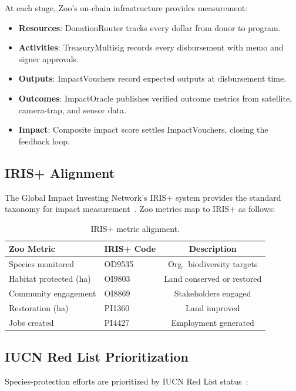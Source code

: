 \documentclass[11pt,letterpaper]{article}
\begin{document}
At each stage, Zoo's on-chain infrastructure provides measurement:

\begin{itemize}
    \item \textbf{Resources}: DonationRouter tracks every dollar from donor to program.
    \item \textbf{Activities}: TreasuryMultisig records every disbursement with memo and signer approvals.
    \item \textbf{Outputs}: ImpactVouchers record expected outputs at disbursement time.
    \item \textbf{Outcomes}: ImpactOracle publishes verified outcome metrics from satellite, camera-trap, and sensor data.
    \item \textbf{Impact}: Composite impact score settles ImpactVouchers, closing the feedback loop.
\end{itemize}

\subsection{IRIS+ Alignment}

The Global Impact Investing Network's IRIS+ system provides the standard taxonomy for impact measurement~\cite{iris2023}. Zoo metrics map to IRIS+ as follows:

\begin{table}[t]
\centering
\small
\begin{tabular}{llc}
\toprule
\textbf{Zoo Metric} & \textbf{IRIS+ Code} & \textbf{Description} \\
\midrule
Species monitored & OD9535 & Org.\ biodiversity targets \\
Habitat protected (ha) & OI9803 & Land conserved or restored \\
Community engagement & OI8869 & Stakeholders engaged \\
Restoration (ha) & PI1360 & Land improved \\
Jobs created & PI4427 & Employment generated \\
\bottomrule
\end{tabular}
\caption{IRIS+ metric alignment.}
\label{tab:iris}
\end{table}

\subsection{IUCN Red List Prioritization}

Species-protection efforts are prioritized by IUCN Red List status~\cite{iucnredlist2023}:
\end{document}
